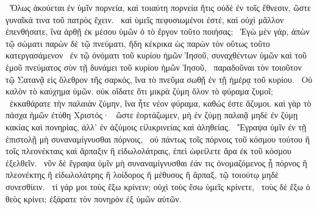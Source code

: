 ~Ὅλως ἀκούεται ἐν ὑμῖν πορνεία, καὶ τοιαύτη πορνεία ἥτις οὐδὲ ἐν τοῖς ἔθνεσιν, ὥστε γυναῖκά τινα τοῦ πατρὸς ἔχειν.
~καὶ ὑμεῖς πεφυσιωμένοι ἐστέ, καὶ οὐχὶ μᾶλλον ἐπενθήσατε, ἵνα ἀρθῇ ἐκ μέσου ὑμῶν ὁ τὸ ἔργον τοῦτο ποιήσας;
~Ἐγὼ μὲν γάρ, ἀπὼν τῷ σώματι παρὼν δὲ τῷ πνεύματι, ἤδη κέκρικα ὡς παρὼν τὸν οὕτως τοῦτο κατεργασάμενον
~ἐν τῷ ὀνόματι τοῦ κυρίου ἡμῶν Ἰησοῦ, συναχθέντων ὑμῶν καὶ τοῦ ἐμοῦ πνεύματος σὺν τῇ δυνάμει τοῦ κυρίου ἡμῶν Ἰησοῦ,
~παραδοῦναι τὸν τοιοῦτον τῷ Σατανᾷ εἰς ὄλεθρον τῆς σαρκός, ἵνα τὸ πνεῦμα σωθῇ ἐν τῇ ἡμέρᾳ τοῦ κυρίου.
~Οὐ καλὸν τὸ καύχημα ὑμῶν. οὐκ οἴδατε ὅτι μικρὰ ζύμη ὅλον τὸ φύραμα ζυμοῖ;
~ἐκκαθάρατε τὴν παλαιὰν ζύμην, ἵνα ἦτε νέον φύραμα, καθώς ἐστε ἄζυμοι. καὶ γὰρ τὸ πάσχα ἡμῶν ἐτύθη Χριστός·
~ὥστε ἑορτάζωμεν, μὴ ἐν ζύμῃ παλαιᾷ μηδὲ ἐν ζύμῃ κακίας καὶ πονηρίας, ἀλλ’ ἐν ἀζύμοις εἰλικρινείας καὶ ἀληθείας.
~Ἔγραψα ὑμῖν ἐν τῇ ἐπιστολῇ μὴ συναναμίγνυσθαι πόρνοις,
~οὐ πάντως τοῖς πόρνοις τοῦ κόσμου τούτου ἢ τοῖς πλεονέκταις καὶ ἅρπαξιν ἢ εἰδωλολάτραις, ἐπεὶ ὠφείλετε ἄρα ἐκ τοῦ κόσμου ἐξελθεῖν.
~νῦν δὲ ἔγραψα ὑμῖν μὴ συναναμίγνυσθαι ἐάν τις  ὀνομαζόμενος ᾖ πόρνος ἢ πλεονέκτης ἢ εἰδωλολάτρης ἢ λοίδορος ἢ μέθυσος ἢ ἅρπαξ, τῷ τοιούτῳ μηδὲ συνεσθίειν.
~τί γάρ μοι τοὺς ἔξω κρίνειν; οὐχὶ τοὺς ἔσω ὑμεῖς κρίνετε,
~τοὺς δὲ ἔξω ὁ θεὸς κρίνει; ἐξάρατε τὸν πονηρὸν ἐξ ὑμῶν αὐτῶν.

